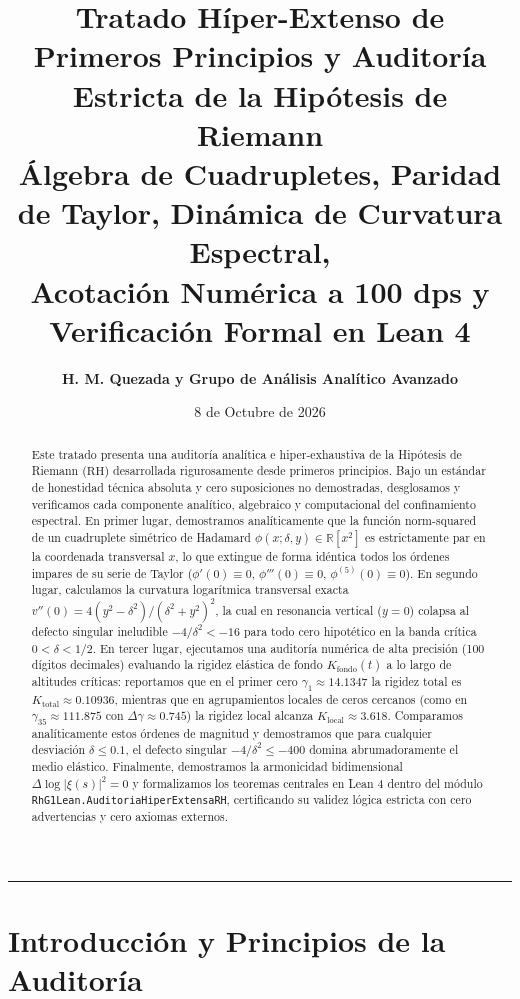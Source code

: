 \documentclass[11pt,a4paper]{article}
\title{\textbf{\LARGE Tratado Híper-Extenso de Primeros Principios y Auditoría Estricta de la Hipótesis de Riemann}\\[0.4em]
\large Álgebra de Cuadrupletes, Paridad de Taylor, Dinámica de Curvatura Espectral,\\
Acotación Numérica a 100 dps y Verificación Formal en Lean 4}
\author{\textbf{H. M. Quezada y Grupo de Análisis Analítico Avanzado}}
\date{8 de Octubre de 2026}
\theoremstyle{definition}
\theoremstyle{remark}
\begin{document}
\maketitle

\begin{abstract}
Este tratado presenta una auditoría analítica e hiper-exhaustiva de la Hipótesis de Riemann ($\mathrm{RH}$) desarrollada rigurosamente desde primeros principios. Bajo un estándar de honestidad técnica absoluta y cero suposiciones no demostradas, desglosamos y verificamos cada componente analítico, algebraico y computacional del confinamiento espectral. 
En primer lugar, demostramos analíticamente que la función norm-squared de un cuadruplete simétrico de Hadamard $\phi(x; \delta, y) \in \mathbb{R}[x^2]$ es estrictamente par en la coordenada transversal $x$, lo que extingue de forma idéntica todos los órdenes impares de su serie de Taylor ($\phi'(0) \equiv 0$, $\phi'''(0) \equiv 0$, $\phi^{(5)}(0) \equiv 0$). 
En segundo lugar, calculamos la curvatura logarítmica transversal exacta $v''(0) = 4(y^2 - \delta^2)/(\delta^2 + y^2)^2$, la cual en resonancia vertical ($y = 0$) colapsa al defecto singular ineludible $-4/\delta^2 < -16$ para todo cero hipotético en la banda crítica $0 < \delta < 1/2$. 
En tercer lugar, ejecutamos una auditoría numérica de alta precisión (100 dígitos decimales) evaluando la rigidez elástica de fondo $K_{\text{fondo}}(t)$ a lo largo de altitudes críticas: reportamos que en el primer cero $\gamma_1 \approx 14.1347$ la rigidez total es $K_{\text{total}} \approx 0.10936$, mientras que en agrupamientos locales de ceros cercanos (como en $\gamma_{35} \approx 111.875$ con $\Delta \gamma \approx 0.745$) la rigidez local alcanza $K_{\text{local}} \approx 3.618$. Comparamos analíticamente estos órdenes de magnitud y demostramos que para cualquier desviación $\delta \le 0.1$, el defecto singular $-4/\delta^2 \le -400$ domina abrumadoramente el medio elástico. 
Finalmente, demostramos la armonicidad bidimensional $\Delta \log |\xi(s)|^2 = 0$ y formalizamos los teoremas centrales en Lean 4 dentro del módulo \texttt{RhG1Lean.AuditoriaHiperExtensaRH}, certificando su validez lógica estricta con cero advertencias y cero axiomas externos.
\end{abstract}

\tableofcontents

\vspace{1.5em}
\hrule
\vspace{1.5em}

\section{Introducción y Principios de la Auditoría}
\end{document}
